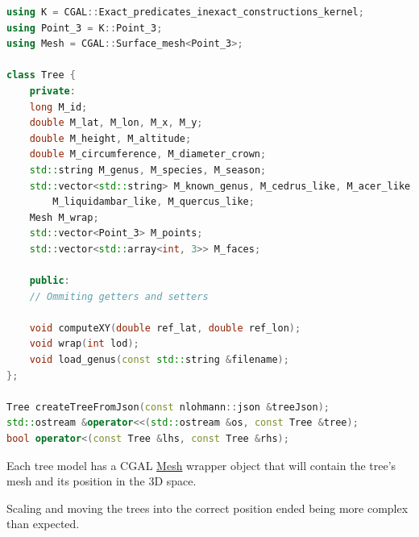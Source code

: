 \documentclass[12pt]{article}
\begin{document}
\begin{lstlisting}[language=C++]
using K = CGAL::Exact_predicates_inexact_constructions_kernel;
using Point_3 = K::Point_3;
using Mesh = CGAL::Surface_mesh<Point_3>;

class Tree {
    private:
    long M_id;                    
    double M_lat, M_lon, M_x, M_y; 
    double M_height, M_altitude;   
    double M_circumference, M_diameter_crown; 
    std::string M_genus, M_species, M_season; 
    std::vector<std::string> M_known_genus, M_cedrus_like, M_acer_like,
        M_liquidambar_like, M_quercus_like;
    Mesh M_wrap;                             
    std::vector<Point_3> M_points;           
    std::vector<std::array<int, 3>> M_faces;

    public:
    // Ommiting getters and setters

    void computeXY(double ref_lat, double ref_lon);
    void wrap(int lod);
    void load_genus(const std::string &filename);
};

Tree createTreeFromJson(const nlohmann::json &treeJson);
std::ostream &operator<<(std::ostream &os, const Tree &tree);
bool operator<(const Tree &lhs, const Tree &rhs);
\end{lstlisting}

Each tree model has a CGAL \href{https://doc.cgal.org/latest/Surface_mesh/classCGAL_1_1Surface__mesh.html}{Mesh}
wrapper object that will contain the tree's
mesh and its position in the 3D space.

Scaling and moving the trees into the correct position ended being more complex
than expected.
\end{document}
